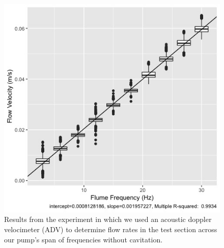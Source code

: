 \documentclass{article}
\begin{document}
\begin{itemize}
\begin{figure}[htbp]
\includegraphics[width=15cm]{frequency_velocity_boxplots.jpeg}
\centering
\caption{Results from the experiment in which we used an acoustic doppler velocimeter (ADV) to determine flow rates in the test section across our pump's span of frequencies without cavitation.}
\label{fig:freqvel}
\end{figure}


\end{itemize}
\end{document}
